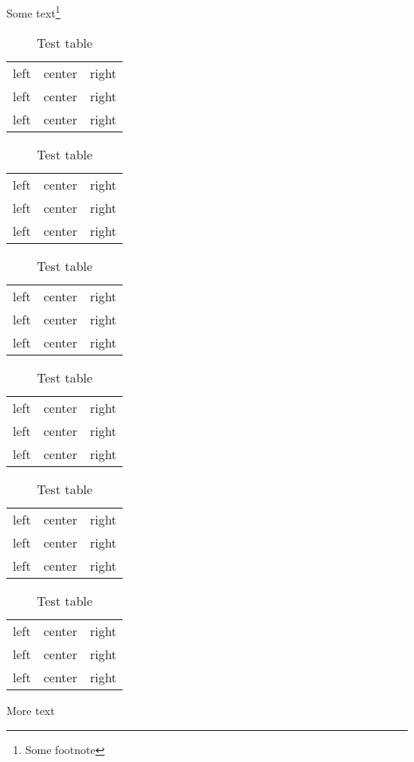 \documentclass{article}
\begin{document}
Some text\footnote{Some footnote}

\begin{table}[t]
  \centering
  \begin{tabular}{lcr}
    left & center & right \\
    left & center & right \\
    left & center & right \\
  \end{tabular}
  \caption{Test table}
\end{table}

\lipsum

\begin{table}[b]
  \centering
  \begin{tabular}{lcr}
    left & center & right \\
    left & center & right \\
    left & center & right \\
  \end{tabular}
  \caption{Test table}
\end{table}
\lipsum[1]
\begin{table}[p]
  \centering
  \begin{tabular}{lcr}
    left & center & right \\
    left & center & right \\
    left & center & right \\
  \end{tabular}
  \caption{Test table}
\end{table}

\begin{table}[p]
  \centering
  \begin{tabular}{lcr}
    left & center & right \\
    left & center & right \\
    left & center & right \\
  \end{tabular}
  \caption{Test table}
\end{table}

\begin{table}[p]
  \centering
  \begin{tabular}{lcr}
    left & center & right \\
    left & center & right \\
    left & center & right \\
  \end{tabular}
  \caption{Test table}
\end{table}

\begin{table}[p]
  \centering
  \begin{tabular}{lcr}
    left & center & right \\
    left & center & right \\
    left & center & right \\
  \end{tabular}
  \caption{Test table}
\end{table}
 
\lipsum
More text
\end{document}
